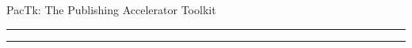 \documentclass[11pt]{article}
\newcommand{\cyanhr}{{\textcolor{cyann!40}{\hrule}}}
\newcommand{\cyanhrdbl}{{\cyanhr}

\vspace{4pt}

{\cyanhr}}
\begin{document}


\thispagestyle{firstpage}



\begin{center}

\vspace*{-34pt}

{\color{red!70!black}\selectfont





{\large{PacTk: The Publishing Accelerator Toolkit}}





}

{\cyanhrdbl}




\end{center}






\vspace*{7pt}
\end{document}
